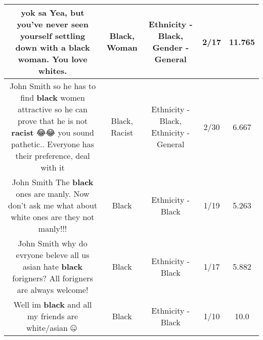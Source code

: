 \documentclass[11pt]{article}
\newlength\mylength
\begin{document}
\begin{center}
\begin{longtable}{|C{.65\mylength}|C{.30\mylength}|C{.12\mylength}|C{.12\mylength}|C{.12\mylength}|}
  \small yok sa Yea, but you've never seen yourself settling down with a \textbf{black} \textbf{woman}. You love whites.\normalsize   & Black, Woman & Ethnicity - Black, Gender - General & 2/17 & 11.765 \\  \hline
  \small John Smith  so he has to find \textbf{black} women attractive so he can prove that he is not \textbf{racist} 😂😂 you sound pathetic.. Everyone has their preference, deal with it\normalsize   & Black, Racist & Ethnicity - Black, Ethnicity - General & 2/30 & 6.667 \\  \hline
  \small John Smith The \textbf{black} ones are manly. Now don't ask me what about white ones are they not manly!!!\normalsize   & Black & Ethnicity - Black & 1/19 & 5.263 \\  \hline
  \small John Smith why do evryone beleve all us asian hate \textbf{black} forigners? All forigners are always welcome!\normalsize   & Black & Ethnicity - Black & 1/17 & 5.882 \\  \hline
  \small Well im \textbf{black} and all my friends are white/asian 🤐😬\normalsize   & Black & Ethnicity - Black & 1/10 & 10.0 \\  \hline
  
\end{longtable}
\end{center}
\end{document}
